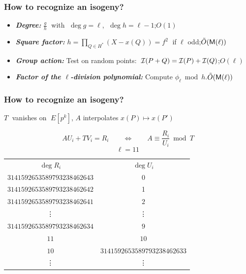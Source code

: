 \documentclass[10pt,usepdftitle=false]{beamer}
\begin{document}
\begin{frame}
  \frametitle{How to recognize an isogeny?}

  \begin{itemize}
    \setlength{\itemsep}{\baselineskip}
  \item \emph{\textbf{Degree:}} $\frac{g}{h}\;$ with $\;\deg g=\ell$, $\;\deg h = \ell-1$;\hfill\alert{$O(1)$}
  \item \emph{\textbf{Square factor:}} $h = \prod_{Q\in H^\ast}(X-
    x(Q)) = f^2\;$ if $\ell$ odd;\hfill\emph{$\tilde{O}(\mathsf{M}(\ell))$}
  \item \emph{\textbf{Group action:}} Test on random points: $\;\mathcal{I}(P+Q)=\mathcal{I}(P)+\mathcal{I}(Q)$;\hfill\emph{$O(\ell)$}
  \item \emph{\textbf{Factor of the $\ell$-division polynomial:}}
    Compute $\phi_\ell\bmod h$.\hfill\emph{$\tilde{O}(\mathsf{M}(\ell))$}
  \end{itemize}
\end{frame}


\begin{frame}
  \frametitle{How to recognize an isogeny?}
  
  \begin{center}
    $T\;$ vanishes on $\;E[p^k]$, $A$ interpolates $x(P)\mapsto x(P')$
  \end{center}
  
  \[AU_i + TV_i = R_i  \qquad\Leftrightarrow\qquad  A\equiv \frac{R_i}{U_i} \bmod T\]
  \[\ell = 11\]
  \pause
  \begin{center}
  \begin{tabular}{c | c}
    $\deg R_i$ & $\deg U_i$ \\
    $3141592653589793238462643$ & 0 \\
    \pause
    $3141592653589793238462642$ & 1 \\
    \pause
    $3141592653589793238462641$ & $2$ \\
    \pause
    \vdots & \vdots\\
    $3141592653589793238462634$ & $9$ \\
    \pause
    \Huge\alert{$11$} & \Huge\alert{$10$}\\
    \pause
    $10$ & $3141592653589793238462633$\\
    \vdots & \vdots
  \end{tabular}
  \end{center}
\end{frame}

\end{document}
